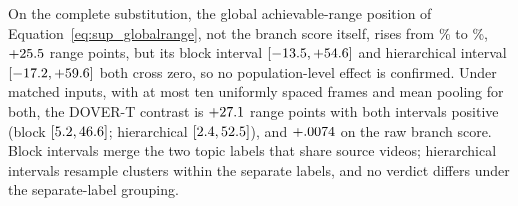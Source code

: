 \documentclass[sn-basic,Numbered]{sn-jnl}
\begin{document}
On the complete substitution, the global achievable-range position of
Equation~\eqref{eq:sup_globalrange}, not the branch score itself, rises from
\dovImplantada{}\% to \dovLiqe{}\%, $+25.5{}$ range points, but its block interval
$[-13.5, +54.6]{}$ and hierarchical interval $[-17.2,+59.6]{}$ both cross zero, so no
population-level effect is confirmed. Under matched inputs, with at most ten uniformly spaced
frames and mean pooling for both, the DOVER-T contrast is $+27.1{}$ range points with
both intervals positive (block $[5.2, 46.6]{}$; hierarchical $[2.4,52.5]{}$), and
$+.0074{}$ on the raw branch score. Block intervals merge the two topic labels that
share source videos; hierarchical intervals resample clusters within the \senBlocos{}
separate labels, and no verdict differs under the separate-label grouping.
\end{document}

